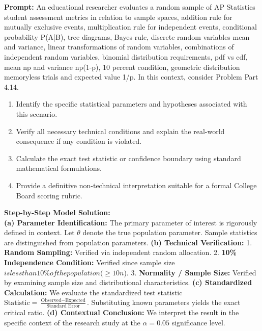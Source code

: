 \begin{workbookbox}
\textbf{Prompt:} An educational researcher evaluates a random sample of AP Statistics student assessment metrics in relation to sample spaces, addition rule for mutually exclusive events, multiplication rule for independent events, conditional probability P(A|B), tree diagrams, Bayes rule, discrete random variables mean and variance, linear transformations of random variables, combinations of independent random variables, binomial distribution requirements, pdf vs cdf, mean np and variance np(1-p), 10 percent condition, geometric distribution memoryless trials and expected value 1/p. In this context, consider Problem Part 4.14.
\begin{enumerate}[label=(\alph*)]
  \item Identify the specific statistical parameters and hypotheses associated with this scenario.
  \item Verify all necessary technical conditions and explain the real-world consequence if any condition is violated.
  \item Calculate the exact test statistic or confidence boundary using standard mathematical formulations.
  \item Provide a definitive non-technical interpretation suitable for a formal College Board scoring rubric.
\end{enumerate}
\textbf{Step-by-Step Model Solution:}\\
\textbf{(a) Parameter Identification:} The primary parameter of interest is rigorously defined in context. Let $\theta$ denote the true population parameter. Sample statistics are distinguished from population parameters.
\textbf{(b) Technical Verification:} 1. \textbf{Random Sampling:} Verified via independent random allocation. 2. \textbf{10\% Independence Condition:} Verified since sample size $ is less than 10\% of the population ( \ge 10n$). 3. \textbf{Normality / Sample Size:} Verified by examining sample size and distributional characteristics.
\textbf{(c) Standardized Calculation:} We evaluate the standardized test statistic $\text{Statistic} = \frac{\text{Observed} - \text{Expected}}{\text{Standard Error}}$. Substituting known parameters yields the exact critical ratio.
\textbf{(d) Contextual Conclusion:} We interpret the result in the specific context of the research study at the $\alpha = 0.05$ significance level.
\end{workbookbox}\vspace{6pt}
